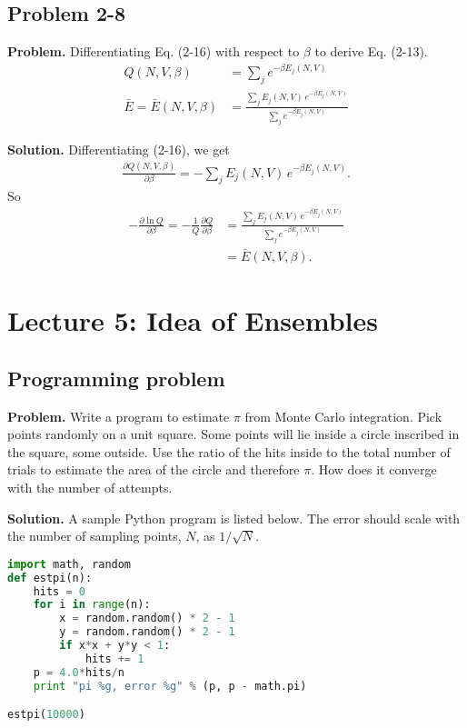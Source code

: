 \documentclass[twocolumn, 10pt]{article}
\numberwithin{equation}{section}
\newenvironment{problem}
{\par\medskip\sffamily \color{problue}
  \textbf{Problem. }\ignorespaces}
{\medskip}
\newenvironment{solution}
{\par\medskip
  \textbf{Solution. }\ignorespaces}
{\medskip}
\begin{document}
\subsection{Problem 2-8}

\begin{problem}
  Differentiating Eq. (2-16) with respect to $\beta$
  to derive Eq. (2-13).
  \begin{align}
    Q(N, V, \beta)
    &= \sum_j e^{-\beta E_j(N, V)}
    \tag{2-16}
    \\
    \bar E = \bar E(N, V, \beta)
    &=
    \frac{ \sum_j E_j(N, V) \, e^{-\beta E_j(N, V)} }
         { \sum_j e^{-\beta E_j(N, V) } }
    \tag{2-13}
  \end{align}
\end{problem}

\begin{solution}
Differentiating (2-16), we get
\begin{align*}
  \frac{ \partial Q(N, V, \beta) } { \partial \beta }
  = -\sum_j E_j(N, V) \, e^{-\beta E_j(N, V)}.
\end{align*}
So
\begin{align*}
  -\frac{ \partial \ln Q } { \partial \beta }
  =
  -\frac{1}{Q}
  \frac{ \partial Q } { \partial \beta }
  &=
  \frac{ \sum_j E_j(N, V) \, e^{-\beta E_j(N, V)} }
       { \sum_j e^{-\beta E_j(N, V)} }
  \\
  &=\bar E(N, V, \beta)
  .
\end{align*}
\end{solution}


\section{Lecture 5: Idea of Ensembles}

\subsection{Programming problem}

\begin{problem}
Write a program to estimate $\pi$ from Monte Carlo integration.
%
Pick points randomly on a unit square.
%
Some points will lie inside a circle inscribed in the square,
some outside.
%
Use the ratio of the hits inside to the total number of trials
to estimate the area of the circle and therefore $\pi$.
%
How does it converge with the number of attempts.
\end{problem}

\begin{solution}
A sample Python program is listed below.
The error should scale
with the number of sampling points, $N$,
as $1/\sqrt N$.

\begin{lstlisting}[language=Python]
import math, random
def estpi(n):
    hits = 0
    for i in range(n):
        x = random.random() * 2 - 1
        y = random.random() * 2 - 1
        if x*x + y*y < 1:
            hits += 1
    p = 4.0*hits/n
    print "pi %g, error %g" % (p, p - math.pi)

estpi(10000)
\end{lstlisting}
\end{solution}
\end{document}
